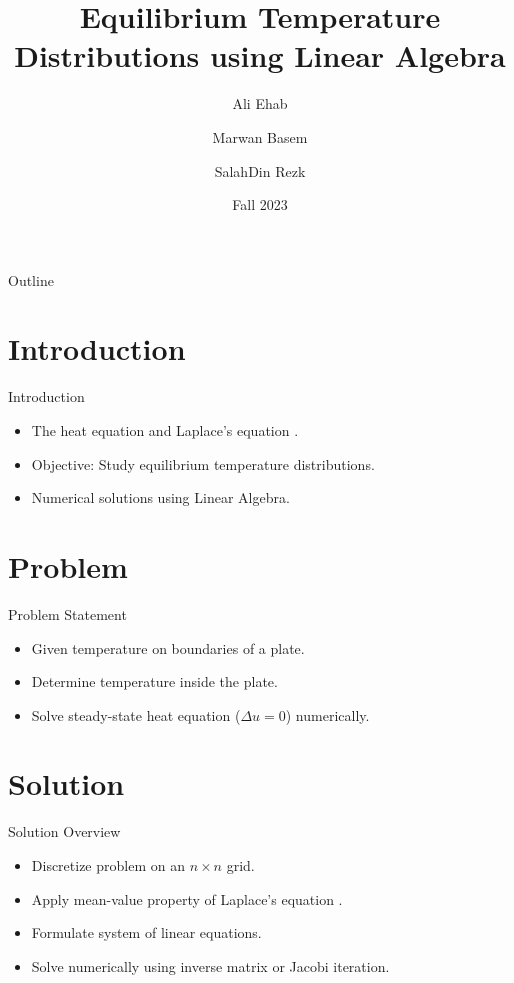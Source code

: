 \documentclass[aspectratio=169]{beamer}
\title{Equilibrium Temperature Distributions using Linear Algebra}
\author{Ali Ehab\and Marwan Basem\and SalahDin Rezk}
\institute{Zewail City - University of Science and Technology}
\date{Fall 2023}
\begin{document}
\begin{frame}
  \titlepage
\end{frame}

\begin{frame}{Outline}
  \tableofcontents
\end{frame}

\section{Introduction}

\begin{frame}{Introduction}
  \begin{itemize}
    \item The heat equation and Laplace's equation \cite{stein}.
    \item Objective: Study equilibrium temperature distributions.
    \item Numerical solutions using Linear Algebra.
  \end{itemize}
\end{frame}

\section{Problem}

\begin{frame}{Problem Statement}
  \begin{itemize}
    \item Given temperature on boundaries of a plate.
    \item Determine temperature inside the plate.
    \item Solve steady-state heat equation ($\Delta u = 0$) numerically.
  \end{itemize}
\end{frame}

\section{Solution}

\begin{frame}{Solution Overview}
  \begin{itemize}
    \item Discretize problem on an $n\times n$ grid.
    \item Apply mean-value property of Laplace's equation \cite{anton}.
    \item Formulate system of linear equations.
    \item Solve numerically using inverse matrix or Jacobi iteration.
  \end{itemize}
\end{frame}
\end{document}
